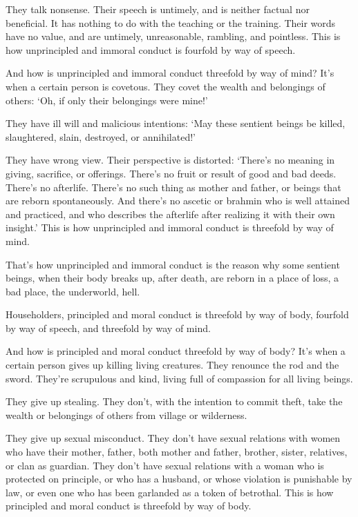 \documentclass[12pt,openany]{book}%
\begin{document}
They talk nonsense. Their speech is untimely, and is neither factual nor beneficial. It has nothing to do with the teaching or the training. Their words have no value, and are untimely, unreasonable, rambling, and pointless. This is how unprincipled and immoral conduct is fourfold by way of speech. 

And how is unprincipled and immoral conduct threefold by way of mind? It's when a certain person is covetous. They covet the wealth and belongings of others: ‘Oh, if only their belongings were mine!’ 

They have ill will and malicious intentions: ‘May these sentient beings be killed, slaughtered, slain, destroyed, or annihilated!’ 

They have wrong view. Their perspective is distorted: ‘There’s no meaning in giving, sacrifice, or offerings. There’s no fruit or result of good and bad deeds. There’s no afterlife. There’s no such thing as mother and father, or beings that are reborn spontaneously. And there’s no ascetic or brahmin who is well attained and practiced, and who describes the afterlife after realizing it with their own insight.’ This is how unprincipled and immoral conduct is threefold by way of mind. 

That’s how unprincipled and immoral conduct is the reason why some sentient beings, when their body breaks up, after death, are reborn in a place of loss, a bad place, the underworld, hell. 

Householders, principled and moral conduct is threefold by way of body, fourfold by way of speech, and threefold by way of mind. 

And how is principled and moral conduct threefold by way of body? It’s when a certain person gives up killing living creatures. They renounce the rod and the sword. They’re scrupulous and kind, living full of compassion for all living beings. 

They give up stealing. They don’t, with the intention to commit theft, take the wealth or belongings of others from village or wilderness. 

They give up sexual misconduct. They don’t have sexual relations with women who have their mother, father, both mother and father, brother, sister, relatives, or clan as guardian. They don’t have sexual relations with a woman who is protected on principle, or who has a husband, or whose violation is punishable by law, or even one who has been garlanded as a token of betrothal. This is how principled and moral conduct is threefold by way of body. 
\end{document}
